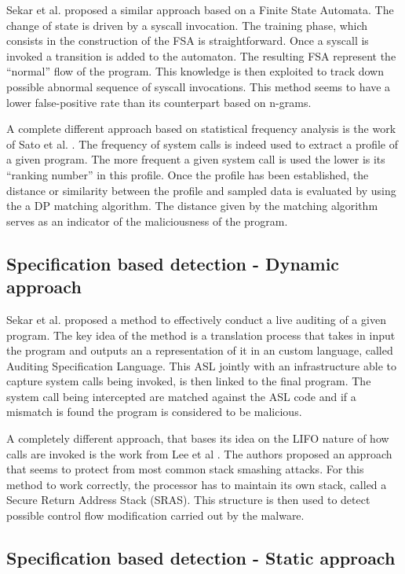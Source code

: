 \documentclass{article}
\begin{document}
Sekar et al. \cite{Sekar} proposed a similar approach based on a Finite State Automata. The change of state is driven by a syscall invocation. The training phase, which consists in the construction of the FSA is straightforward. Once a syscall is invoked a transition is added to the automaton. The resulting FSA represent the ``normal'' flow of the program. This knowledge is then exploited to track down possible abnormal sequence of syscall invocations. This method seems to have a lower false-positive rate than its counterpart based on n-grams.

A complete different approach based on statistical frequency analysis is the work of Sato et al. \cite{Sato}. The frequency of system calls is indeed used to extract a profile of a given program. The more frequent a given system call is used the lower is its ``ranking number'' in this profile. Once the profile has been established, the distance or similarity between the profile and sampled data is evaluated by using the a DP matching algorithm. The distance given by the matching algorithm serves as an indicator of the maliciousness of the program.

\subsection{Specification based detection - Dynamic approach}

Sekar et al. \cite{Sekar2} proposed a method to effectively conduct a live auditing of a given program. The key idea of the method is a translation process that takes in input the program and outputs an a representation of it in an custom language, called Auditing Specification Language. This ASL jointly with an infrastructure able to capture system calls being invoked, is then linked to the final program. The system call being intercepted are matched against the ASL code and if a mismatch is found the program is considered to be malicious.

A completely different approach, that bases its idea on the LIFO nature of how calls are invoked is the work from Lee et al \cite{lee}. The authors proposed an approach that seems to protect from most common stack smashing attacks. For this method to work correctly, the processor has to maintain its own stack, called a Secure Return Address Stack (SRAS). This structure is then used to detect possible control flow modification carried out by the malware.

\subsection{Specification based detection - Static approach}
\end{document}
